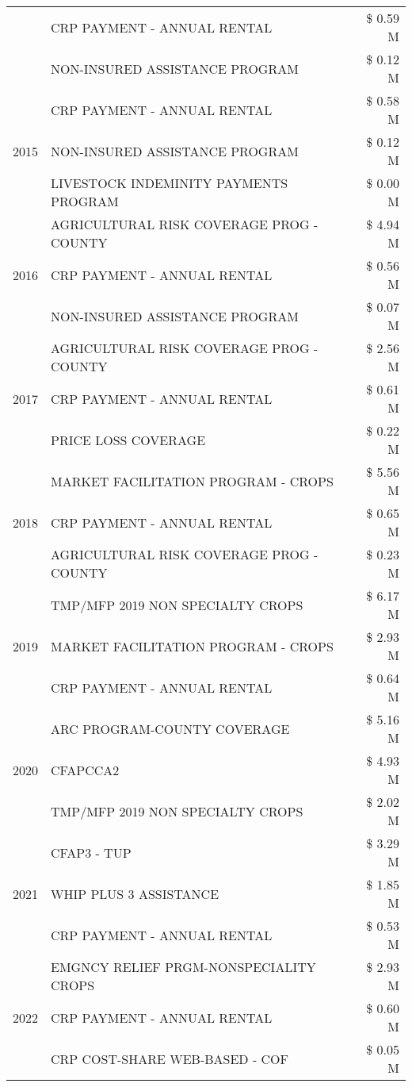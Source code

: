 \begin{tabular}{llr}
 & CRP PAYMENT - ANNUAL RENTAL & \$ 0.59 M \\
 & NON-INSURED ASSISTANCE PROGRAM & \$ 0.12 M \\
\cline{1-3}
\multirow[t]{3}{*}{2015} & CRP PAYMENT - ANNUAL RENTAL & \$ 0.58 M \\
 & NON-INSURED ASSISTANCE PROGRAM & \$ 0.12 M \\
 & LIVESTOCK INDEMINITY PAYMENTS PROGRAM & \$ 0.00 M \\
\cline{1-3}
\multirow[t]{3}{*}{2016} & AGRICULTURAL RISK COVERAGE PROG - COUNTY & \$ 4.94 M \\
 & CRP PAYMENT - ANNUAL RENTAL & \$ 0.56 M \\
 & NON-INSURED ASSISTANCE PROGRAM & \$ 0.07 M \\
\cline{1-3}
\multirow[t]{3}{*}{2017} & AGRICULTURAL RISK COVERAGE PROG - COUNTY & \$ 2.56 M \\
 & CRP PAYMENT - ANNUAL RENTAL & \$ 0.61 M \\
 & PRICE LOSS COVERAGE & \$ 0.22 M \\
\cline{1-3}
\multirow[t]{3}{*}{2018} & MARKET FACILITATION PROGRAM - CROPS & \$ 5.56 M \\
 & CRP PAYMENT - ANNUAL RENTAL & \$ 0.65 M \\
 & AGRICULTURAL RISK COVERAGE PROG - COUNTY & \$ 0.23 M \\
\cline{1-3}
\multirow[t]{3}{*}{2019} & TMP/MFP 2019 NON SPECIALTY CROPS & \$ 6.17 M \\
 & MARKET FACILITATION PROGRAM - CROPS & \$ 2.93 M \\
 & CRP PAYMENT - ANNUAL RENTAL & \$ 0.64 M \\
\cline{1-3}
\multirow[t]{3}{*}{2020} & ARC PROGRAM-COUNTY COVERAGE & \$ 5.16 M \\
 & CFAPCCA2 & \$ 4.93 M \\
 & TMP/MFP 2019 NON SPECIALTY CROPS & \$ 2.02 M \\
\cline{1-3}
\multirow[t]{3}{*}{2021} & CFAP3 - TUP & \$ 3.29 M \\
 & WHIP PLUS 3 ASSISTANCE & \$ 1.85 M \\
 & CRP PAYMENT - ANNUAL RENTAL & \$ 0.53 M \\
\cline{1-3}
\multirow[t]{3}{*}{2022} & EMGNCY RELIEF PRGM-NONSPECIALITY CROPS & \$ 2.93 M \\
 & CRP PAYMENT - ANNUAL RENTAL & \$ 0.60 M \\
 & CRP COST-SHARE WEB-BASED - COF & \$ 0.05 M \\
\cline{1-3}
\bottomrule
\end{tabular}
